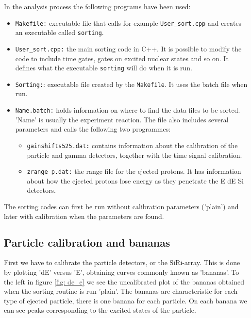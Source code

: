 \documentclass[11pt,a4wide]{article}
\begin{document}
In the analysis process the following programs have been used:
\begin{itemize}
\item \texttt{Makefile:} executable file that calls for example \texttt{User\_sort.cpp} and creates an executable called \texttt{sorting}.
\item \texttt{User\_sort.cpp:} the main sorting code in C++. It is possible to modify the code to include time gates, gates on excited nuclear states and so on. It defines what the executable \texttt{sorting} will do when it is run. 
\item \texttt{Sorting:}: executable file created by the \texttt{Makefile}. It uses the batch file when run.
\item \texttt{Name.batch:} holds information on where to find the data files to be sorted. 'Name' is usually the experiment reaction. The file also includes several parameters and calls the following two programmes:
\begin{itemize}
\item \texttt{gainshifts525.dat:} contains information about the calibration of the particle and gamma detectors, together with the time signal calibration.
\item \texttt{zrange p.dat:} the range file for the ejected protons. It has information about how the ejected protons lose energy as they penetrate the E dE Si detectors.
\end{itemize}
\end{itemize}
The sorting codes can first be run without calibration parameters ('plain') and later with calibration when the parameters are found. 



\subsection{Particle calibration and bananas}
First we have to calibrate the particle detectors, or the SiRi-array. This is done by plotting 'dE' versus 'E', obtaining curves commonly known as 'bananas'. To the left in figure \ref{fig: de_e} we see the uncalibrated plot of the bananas obtained when the sorting routine is run 'plain'. The bananas are characteristic for each type of ejected particle, there is one banana for each particle. On each banana we can see peaks corresponding to the excited states of the particle. 
\end{document}
